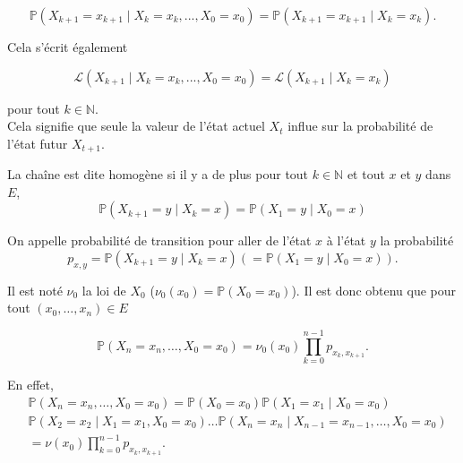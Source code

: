 \begin{sloppypar}
\begin{tcolorbox}[colback=blue!5!white,colframe=blue!75!black,title=Définition]
\begin{equation}
\mathbb{P}(X_{k+1} = x_{k+1} \mid X_k = x_k,...,X_0 = x_0) = \mathbb{P}(X_{k+1} = x_{k+1} \mid X_k = x_k).    
\end{equation}

Cela s’écrit également

\begin{equation}
\mathcal{L}(X_{k+1} \mid X_k = x_k,...,X_0 = x_0) = \mathcal{L}(X_{k+1} \mid X_k = x_k)    
\end{equation}

pour tout $k \in \mathbb{N}$.\\

Cela signifie que seule la valeur de l'état actuel \(X_t\) influe sur la probabilité de l'état futur \(X_{t+1}\).\\
\end{tcolorbox}


La chaîne est dite homogène si il y a de plus pour tout $k \in \mathbb{N}$ et tout $x$ et $y$ dans $E$,
\begin{equation}
    \mathbb{P}(X_{k+1} = y \mid X_k = x) = \mathbb{P}(X_1 = y \mid X_0 = x)  
\end{equation}

\begin{tcolorbox}[colback=blue!5!white,colframe=blue!75!black,title=Définition]
    On appelle probabilité de transition pour aller de l’état $x$ à l’état $y$ la probabilité
    \begin{equation}
    p_{x,y} = \mathbb{P}(X_{k+1} = y \mid X_k = x) (= \mathbb{P}(X_1 = y \mid X_0 = x)).
    \end{equation}
    \end{tcolorbox}


Il est noté $\nu_0$ la loi de $X_0$ ($\nu_0(x_0) = \mathbb{P}(X_0 = x_0)$). Il est donc obtenu que pour tout $(x_0, \dots, x_n) \in E$

\begin{equation}
\mathbb{P}(X_n = x_n, \dots, X_0 = x_0) = \nu_0(x_0) \prod_{k=0}^{n-1} p_{x_k, x_{k+1}}.   
\end{equation}

En effet, 
\begin{equation}
\begin{split}
 &\mathbb{P}(X_n = x_n, \dots, X_0 = x_0) = \mathbb{P}(X_0 = x_0) \mathbb{P}(X_1 = x_1 \mid X_0 = x_0) \\
&\mathbb{P}(X_2 = x_2 \mid X_1 = x_1, X_0 = x_0) \dots \mathbb{P}(X_n = x_n \mid X_{n-1} = x_{n-1}, \dots, X_0 = x_0)\\
&= \nu(x_0) \prod_{k=0}^{n-1} p_{x_k, x_{k+1}}.
\end{split}   
\end{equation}


\end{sloppypar}
